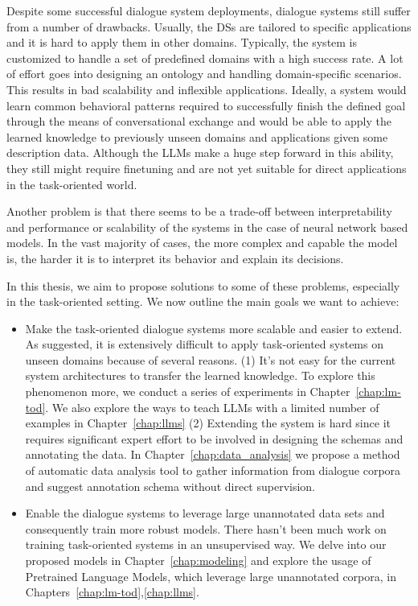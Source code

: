 Despite some successful dialogue system deployments, dialogue systems still suffer from a number of drawbacks.
Usually, the DSs are tailored to specific applications and it is hard to apply them in other domains.
Typically, the system is customized to handle a set of predefined domains with a high success rate.
A lot of effort goes into designing an ontology and handling domain-specific scenarios.
This results in bad scalability and inflexible applications.
Ideally, a system would learn common behavioral patterns required to successfully finish the defined goal through the means of conversational exchange and would be able to apply the learned knowledge to previously unseen domains and applications given some description data.
Although the LLMs make a huge step forward in this ability, they still might require finetuning and are not yet suitable for direct applications in the task-oriented world.

Another problem is that there seems to be a trade-off between interpretability and performance or scalability of the systems in the case of neural network based models.
In the vast majority of cases, the more complex and capable the model is, the harder it is to interpret its behavior and explain its decisions.

In this thesis, we aim to propose solutions to some of these problems, especially in the task-oriented setting.
We now outline the main goals we want to achieve:
\begin{itemize}
    \item Make the task-oriented dialogue systems more scalable and easier to extend. As suggested, it is extensively difficult to apply task-oriented systems on unseen domains because of several reasons. (1) It's not easy for the current system architectures to transfer the learned knowledge. To explore this phenomenon more, we conduct a series of experiments in Chapter~\ref{chap:lm-tod}. We also explore the ways to teach LLMs with a limited number of examples in Chapter~\ref{chap:llms} (2) Extending the system is hard since it requires significant expert effort to be involved in designing the schemas and annotating the data. In Chapter~\ref{chap:data_analysis} we propose a method of automatic data analysis tool to gather information from dialogue corpora and suggest annotation schema without direct supervision.
    \item Enable the dialogue systems to leverage large unannotated data sets and consequently train more robust models. There hasn't been much work on training task-oriented systems in an unsupervised way. We delve into our proposed models in Chapter~\ref{chap:modeling} and explore the usage of Pretrained Language Models, which leverage large unannotated corpora, in Chapters~\ref{chap:lm-tod},\ref{chap:llms}.
\end{itemize}

